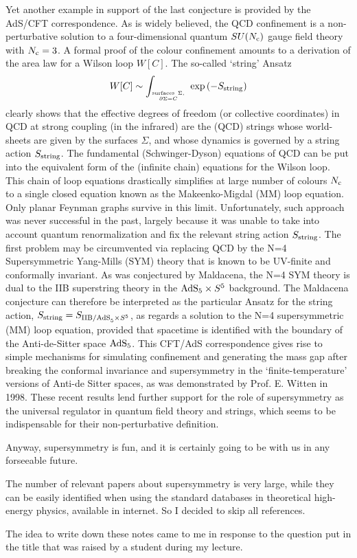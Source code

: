 \documentclass[a4paper,a4paper]{article}
\begin{document}
Yet another example in support of the last conjecture is provided by the
AdS/CFT correspondence.  As is widely believed, the QCD confinement is a 
non-perturbative solution to a four-dimensional quantum $SU(N_{\rm c})$  
gauge field theory with $N_{\rm c}=3$. A formal proof of the colour 
confinement amounts to a derivation of the area law for a  Wilson loop $W[C]$.
The so-called `string' Ansatz 
$$ W[C] \sim \int_{{\rm surfaces~}\Sigma,\atop \partial\Sigma=C}\; 
\exp\left(-S_{\rm string}\right) $$
clearly shows that the effective degrees of freedom (or collective 
coordinates) in QCD at strong coupling (in the infrared) are the (QCD) strings
whose world-sheets are given by the surfaces $\Sigma$, and whose dynamics is 
governed by a string action $S_{\rm string}$. The fundamental 
(Schwinger-Dyson) equations of QCD can be put into the equivalent form of the
(infinite chain) equations for the Wilson loop. This chain of loop equations 
drastically simplifies at large number of colours $N_{\rm c}$ to a 
single closed equation known as the  Makeenko-Migdal (MM) loop equation. Only
planar Feynman graphs survive in this limit. Unfortunately, such approach was
never successful in the past, largely because it was unable to take into 
account quantum renormalization and fix the relevant string action 
$S_{\rm string}$. The first problem may be circumvented via replacing QCD by 
the N=4 Supersymmetric Yang-Mills (SYM) theory that is known to be UV-finite
 and conformally invariant. As was conjectured by Maldacena, the N=4 SYM 
theory is dual to the IIB superstring theory in the ${\rm AdS}_5\times S^5$ 
background. The Maldacena conjecture can therefore be interpreted as the 
particular Ansatz for the string action, 
$S_{\rm string}=S_{{\rm IIB/AdS}_5\times S^5}$, as regards a solution to the 
N=4 supersymmetric (MM) loop equation, provided that spacetime is identified 
with the boundary of the  Anti-de-Sitter space ${\rm AdS}_5$. This CFT/AdS 
correspondence gives rise to simple mechanisms for simulating confinement and
generating the mass gap after breaking the conformal invariance and 
supersymmetry in the `finite-temperature' versions of Anti-de Sitter spaces,
as was demonstrated by Prof. E. Witten in 1998. These recent results lend 
further support for the role of supersymmetry as the universal regulator in
quantum field theory and strings, which seems to be indispensable for their
non-perturbative definition. 

Anyway, supersymmetry is fun, and it is certainly going to be with us in any
forseeable future.

The number of relevant papers about supersymmetry is very large, while they 
can be easily identified  when using the standard databases in theoretical 
high-energy physics, available in internet. So I decided to skip all 
references. 

The idea to write down these notes came to me in response to the question 
put in the title that was raised by a student during my lecture.
\end{document}
